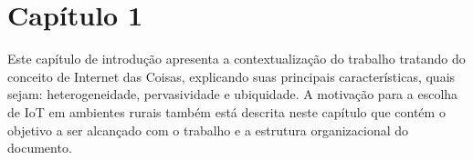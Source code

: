 \documentclass[
    hidelinks,
	12pt,				%
	openany,
	oneside, 
	a4paper,			%
	english,			%
	french,				%
	spanish,			%
	brazil				%
	]{abntex2}
\begin{document}
\listoffigures*
\cleardoublepage
%
%
%
%
\tableofcontents*
\cleardoublepage
%
%
%
\textual
%

%

\chapter*[Capítulo 1]{Capítulo 1}

Este capítulo de introdução apresenta a contextualização do trabalho tratando do conceito de Internet das Coisas, explicando suas principais características, quais sejam: heterogeneidade, pervasividade e ubiquidade. A motivação para a escolha de IoT em ambientes rurais também está descrita neste capítulo que contém  o objetivo a ser alcançado com o trabalho e a estrutura organizacional do documento.
\end{document}
